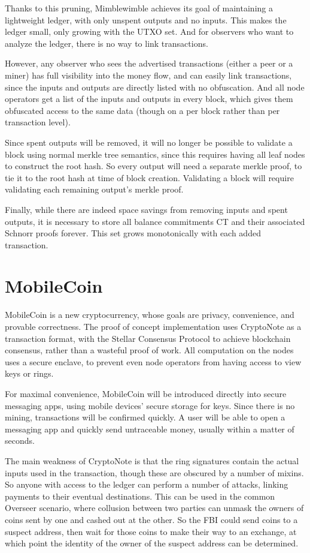 \documentclass{article}
\begin{document}
Thanks to this pruning, Mimblewimble achieves its goal of maintaining a lightweight ledger, with only unspent outputs and no inputs.  This makes the ledger small, only growing with the UTXO set.  And for observers who want to analyze the ledger, there is no way to link transactions.

However, any observer who sees the advertised transactions (either a peer or a miner) has full visibility into the money flow, and can easily link transactions, since the inputs and outputs are directly listed with no obfuscation.  And all node operators get a list of the inputs and outputs in every block, which gives them obfuscated access to the same data (though on a per block rather than per transaction level).

Since spent outputs will be removed, it will no longer be possible to validate a block using normal merkle tree semantics, since this requires having all leaf nodes to construct the root hash.  So every output will need a separate merkle proof, to tie it to the root hash at time of block creation.  Validating a block will require validating each remaining output's merkle proof.

Finally, while there are indeed space savings from removing inputs and spent outputs, it is necessary to store all balance commitments CT and their associated Schnorr proofs forever.  This set grows monotonically with each added transaction.  



\section{MobileCoin}

MobileCoin is a new cryptocurrency, whose goals are privacy, convenience, and provable correctness.  The proof of concept implementation uses CryptoNote as a transaction format, with the Stellar Consensus Protocol to achieve blockchain consensus, rather than a wasteful proof of work.  All computation on the nodes uses a secure enclave, to prevent even node operators from having access to view keys or rings.  

For maximal convenience, MobileCoin will be introduced directly into secure messaging apps, using mobile devices' secure storage for keys.  Since there is no mining, transactions will be confirmed quickly.  A user will be able to open a messaging app and quickly send untraceable money, usually within a matter of seconds.

The main weakness of CryptoNote is that the ring signatures contain the actual inputs used in the transaction, though these are obscured by a number of mixins.  So anyone with access to the ledger can perform a number of attacks, linking payments to their eventual destinations.  This can be used in the common Overseer scenario, where collusion between two parties can unmask the owners of coins sent by one and cashed out at the other.  So the FBI could send coins to a suspect address, then wait for those coins to make their way to an exchange, at which point the identity of the owner of the suspect address can be determined.
\end{document}
